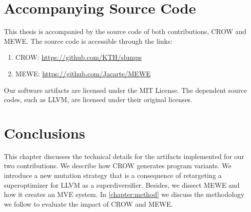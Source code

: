 \section{Accompanying Source Code}

This thesis is accompanied by the source code of both contributions, CROW and MEWE. The source code is accessible through the links:
\begin{enumerate}
    \item CROW: \url{https://github.com/KTH/slumps}
    \item MEWE: \url{https://github.com/Jacarte/MEWE}
\end{enumerate}

Our software artifacts are licensed under the MIT License. The dependent source codes, such as LLVM, are licensed under their original licenses.

\section*{Conclusions}

This chapter discusses the technical details for the artifacts implemented for our two contributions.
We describe how CROW generates program variants.
We introduce a new mutation strategy that is a consequence of retargeting a superoptimizer for LLVM as a superdiversifier.
Besides, we dissect MEWE and how it creates an MVE system.
In \autoref{chapter:method} we discuss the methodology we follow to evaluate the impact of CROW and MEWE.